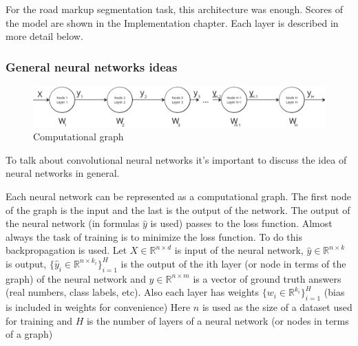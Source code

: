 For the road markup segmentation task, this architecture was enough. Scores of the model are shown in the Implementation chapter. 
Each layer is described in more detail below.
\subsubsection{General neural networks ideas}
\begin{figure}[h]
    \begin{center}
    \includegraphics[scale=0.35]{src/Design/assets/computational_graph.png}
    \end{center}
    \caption{Computational graph}\label{com_graph}
\end{figure}
To talk about convolutional neural networks it's important to discuss the idea of neural networks in general.

Each neural network can be represented as a computational graph. The first node of the graph is the input and the last is the output of the network.
The output of the neural network (in formulas $\hat{y}$ is used) passes to the loss function. Almost always the task of training is to minimize the loss function.
To do this backpropagation is used.
Let $X \in \mathbb{R}^{n\times d}$ is input of the neural network, $\hat{y}\in \mathbb{R}^{n\times k}$ is output, $\{\hat{y}_i \in \mathbb{R}^{n \times k_i}\} _{i=1}^{H}$ 
is the output of the ith layer (or node in terms of the graph) of the neural network and $y \in \mathbb{R}^{n\times m}$ is a vector of ground truth answers 
(real numbers, class labels, etc). Also each layer has weights $\{ w_i \in \mathbb{R}^{k_i} \} _{i=1}^{H}$ (bias is included in weights for convenience) 
Here $n$ is used as the size of a dataset used for training and $H$ is the number of layers of a neural network (or nodes in terms of a graph)


